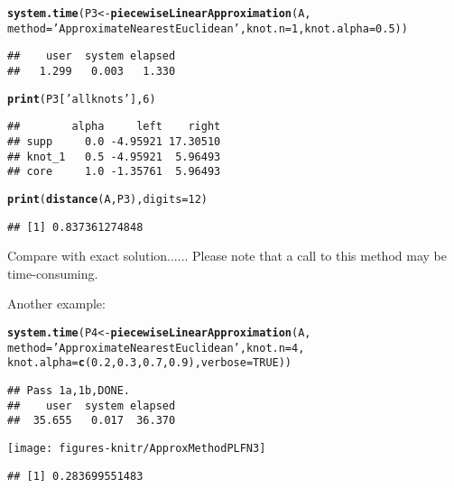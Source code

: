 \documentclass[11pt]{article}\usepackage{graphicx, color}
\makeatletter
\newcommand{\hlfunctioncall}[1]{\textcolor[rgb]{0.501960784313725,0,0.329411764705882}{\textbf{#1}}}%
\newcommand{\hlstring}[1]{\textcolor[rgb]{0.6,0.6,1}{#1}}%
\newenvironment{kframe}{%
 \def\at@end@of@kframe{}%
 \ifinner\ifhmode%
  \def\at@end@of@kframe{\end{minipage}}%
  \begin{minipage}{\columnwidth}%
 \fi\fi%
 \def\FrameCommand##1{\hskip\@totalleftmargin \hskip-\fboxsep
 \colorbox{shadecolor}{##1}\hskip-\fboxsep
     \hskip-\linewidth \hskip-\@totalleftmargin \hskip\columnwidth}%
 \MakeFramed {\advance\hsize-\width
   \@totalleftmargin\z@ \linewidth\hsize
   \@setminipage}}%
 {\par\unskip\endMakeFramed%
 \at@end@of@kframe}
\newenvironment{knitrout}{}{} %
\makeatother
\begin{document}
\begin{knitrout}\small
{}\color{fgcolor}\begin{kframe}
\begin{alltt}
\hlfunctioncall{system.time}(P3 <- \hlfunctioncall{piecewiseLinearApproximation}(A,
   method=\hlstring{'ApproximateNearestEuclidean'}, knot.n=1, knot.alpha=0.5))
\end{alltt}
\begin{verbatim}
##    user  system elapsed 
##   1.299   0.003   1.330
\end{verbatim}
\begin{alltt}
\hlfunctioncall{print}(P3[\hlstring{'allknots'}], 6)
\end{alltt}
\begin{verbatim}
##        alpha     left    right
## supp     0.0 -4.95921 17.30510
## knot_1   0.5 -4.95921  5.96493
## core     1.0 -1.35761  5.96493
\end{verbatim}
\begin{alltt}
\hlfunctioncall{print}(\hlfunctioncall{distance}(A, P3), digits=12)
\end{alltt}
\begin{verbatim}
## [1] 0.837361274848
\end{verbatim}
\end{kframe}
\end{knitrout}

\noindent
Compare with exact solution......
Please note that a call to this method may be time-consuming.

Another example:

\begin{knitrout}\small
{}\color{fgcolor}\begin{kframe}
\begin{alltt}
\hlfunctioncall{system.time}(P4 <- \hlfunctioncall{piecewiseLinearApproximation}(A,
   method=\hlstring{'ApproximateNearestEuclidean'}, knot.n=4,
   knot.alpha=\hlfunctioncall{c}(0.2, 0.3, 0.7, 0.9), verbose=TRUE))
\end{alltt}
\begin{verbatim}
## Pass 1a,1b,DONE.
##    user  system elapsed 
##  35.655   0.017  36.370
\end{verbatim}
\end{kframe}
\end{knitrout}


\begin{center}
\begin{knitrout}\small
{}\color{fgcolor}

{\centering \texttt{[image: figures-knitr/ApproxMethodPLFN3]} 

}


\begin{kframe}\begin{verbatim}
## [1] 0.283699551483
\end{verbatim}
\end{kframe}
\end{knitrout}

\end{center}
\end{document}
